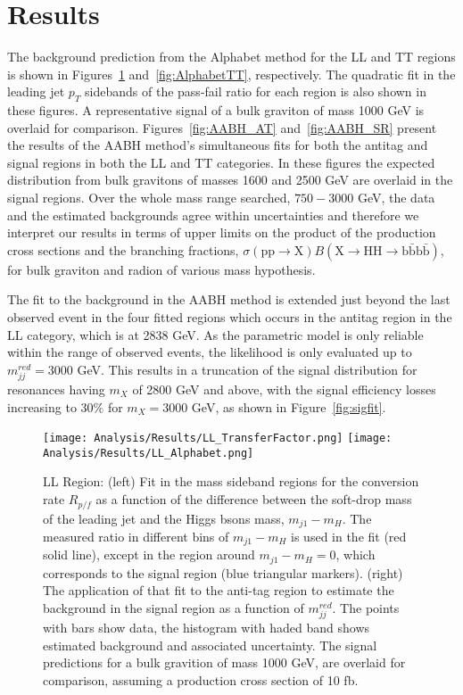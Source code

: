 \section{Results}
\label{sec:Results}

The background prediction from the Alphabet method for the LL and TT regions is shown in Figures~\ref{fig:AlphabetLL} and~\ref{fig:AlphabetTT}, respectively. The quadratic fit in the leading jet $p_{T}$ sidebands of the pass-fail ratio for each region is also shown in these figures. A representative signal of a bulk graviton of mass 1000 GeV is overlaid for comparison. Figures~\ref{fig:AABH_AT} and~\ref{fig:AABH_SR} present the results of the AABH method's simultaneous fits for both the antitag and signal regions in both the LL and TT categories. In these figures the expected distribution from bulk gravitons of masses 1600 and 2500 GeV are overlaid in the signal regions. Over the whole mass range searched, $750-3000$ GeV, the data and the estimated backgrounds agree within uncertainties and therefore we interpret our results in terms of upper limits on the product of the production cross sections and the branching fractions, $\sigma(\mathrm{pp}\rightarrow \mathrm{X})B(\mathrm{X}\rightarrow\mathrm{HH}\rightarrow\mathrm{b\bar{b}b\bar{b}})$, for bulk graviton and radion of various mass hypothesis.

The fit to the background in the AABH method is extended just beyond the last observed event in the four fitted regions which occurs in the antitag region in the LL category, which is at 2838 GeV. As the parametric model is only reliable within the range of observed events, the likelihood is only evaluated up to $m_{jj}^{red} = 3000$ GeV. This results in a truncation of the signal distribution for resonances having $m_{X}$ of 2800 GeV and above, with the signal efficiency losses increasing to $30\%$ for $m_{X}=3000$ GeV, as shown in Figure~\ref{fig:sigfit}.

\begin{figure}[h]
\centering
\texttt{[image: Analysis/Results/LL\_TransferFactor.png]}
\texttt{[image: Analysis/Results/LL\_Alphabet.png]}
\caption{LL Region: (left) Fit in the mass sideband regions for the conversion rate $R_{p/f}$ as a function of the difference between the soft-drop mass of the leading jet and the Higgs bsons mass, $m_{j1}-m_{H}$. The measured ratio in different bins of $m_{j1}-m_{H}$  is used in the fit (red solid line), except in the region around $m_{j1}-m_{H}=0$, which corresponds to the signal region (blue triangular markers). (right) The application of that fit to the anti-tag region to estimate the background in the signal region as a function of $m_{jj}^{red}$. The points with bars show data, the histogram with haded band shows estimated background and associated uncertainty. The signal predictions for a bulk gravition of mass 1000 GeV, are overlaid for comparison, assuming a production cross section of 10 fb.}
\label{fig:AlphabetLL}
\end{figure}


